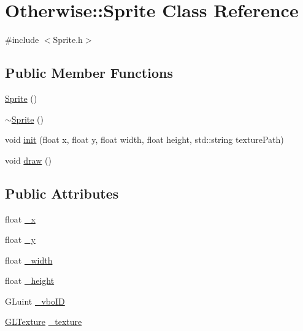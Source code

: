 \hypertarget{class_otherwise_1_1_sprite}{}\section{Otherwise\+:\+:Sprite Class Reference}
\label{class_otherwise_1_1_sprite}


{\ttfamily \#include $<$Sprite.\+h$>$}

\subsection*{Public Member Functions}
\begin{DoxyCompactItemize}
\item 
\hyperlink{class_otherwise_1_1_sprite_a24340f5998b4b28f80f4238979d7c4c3}{Sprite} ()
\item 
\hyperlink{class_otherwise_1_1_sprite_afd2cdb487909db9fed57ac26df1b65a2}{$\sim$\+Sprite} ()
\item 
void \hyperlink{class_otherwise_1_1_sprite_abc46fb53d9a13586d5b5d6fd81c1a9c1}{init} (float x, float y, float width, float height, std\+::string texture\+Path)
\item 
void \hyperlink{class_otherwise_1_1_sprite_a54c174b92dfe9532c4bc3e0a66524c45}{draw} ()
\end{DoxyCompactItemize}
\subsection*{Public Attributes}
\begin{DoxyCompactItemize}
\item 
float \hyperlink{class_otherwise_1_1_sprite_ae0dc89a4db9e9eab2654abbc9e300646}{\+\_\+x}
\item 
float \hyperlink{class_otherwise_1_1_sprite_a405612a3c8bbfff90cbdcaf77dbe4597}{\+\_\+y}
\item 
float \hyperlink{class_otherwise_1_1_sprite_a8a3b90dc24d0d934d075852aeddf06a7}{\+\_\+width}
\item 
float \hyperlink{class_otherwise_1_1_sprite_a4266c4637ad8dfdf32289669c370f958}{\+\_\+height}
\item 
G\+Luint \hyperlink{class_otherwise_1_1_sprite_ad361d8ef72b8ecad27efa259605d50b6}{\+\_\+vbo\+ID}
\item 
\hyperlink{struct_otherwise_1_1_g_l_texture}{G\+L\+Texture} \hyperlink{class_otherwise_1_1_sprite_ad317f110e7fc29336aecf1d6f9c0b2e1}{\+\_\+texture}
\end{DoxyCompactItemize}


